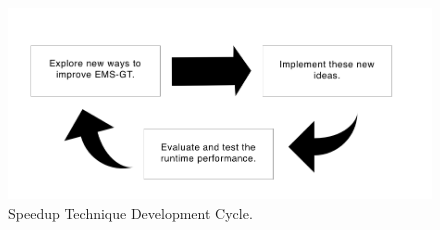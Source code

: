 \begin{figure}[h]
	\centering
	\label{fig:methodology}
	\includegraphics[width=5.5in]{contents/00_images/methodology}
	\caption{Speedup Technique Development Cycle.}
\end{figure} 